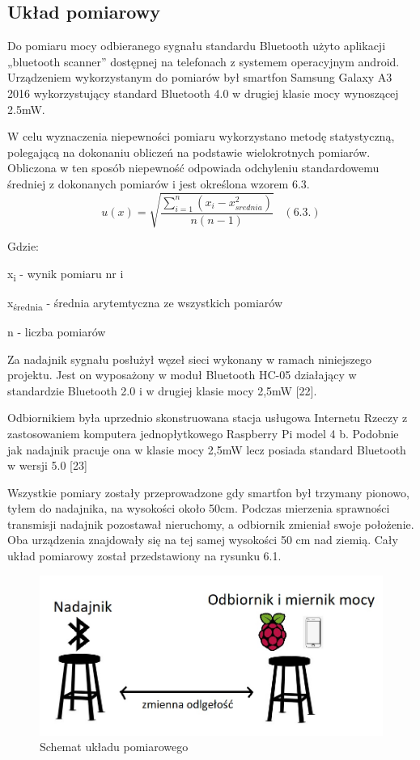 \documentclass[12pt, twoside, openany]{mwrep}
\begin{document}
\subsection{Układ pomiarowy}
Do pomiaru mocy odbieranego sygnału standardu Bluetooth użyto aplikacji „bluetooth scanner” dostępnej na telefonach z systemem operacyjnym android. Urządzeniem wykorzystanym do pomiarów był smartfon Samsung Galaxy A3 2016 wykorzystujący standard Bluetooth 4.0 w drugiej klasie mocy wynoszącej 2.5mW.
\par
W celu wyznaczenia niepewności pomiaru wykorzystano metodę statystyczną, polegającą na dokonaniu obliczeń na podstawie wielokrotnych pomiarów. Obliczona w ten sposób niepewność odpowiada odchyleniu standardowemu średniej z dokonanych pomiarów i jest określona wzorem  6.3.
\[ u(x) = \sqrt{ \frac{ \sum_{i=1}^{n} (x_i -x_{srednia}^2) } { n(n-1)  }}  \; \; \;  (6.3.)\]
\par
Gdzie: \par
 x\textsubscript{i}  - wynik pomiaru nr i 
\par
 x\textsubscript{średnia}  - średnia arytemtyczna ze wszystkich pomiarów
\par
 n - liczba pomiarów
\par

Za nadajnik sygnału posłużył węzeł sieci wykonany w ramach niniejszego projektu. Jest on wyposażony w moduł Bluetooth HC-05 działający w standardzie Bluetooth 2.0 i w drugiej klasie mocy 2,5mW [22]. \par
Odbiornikiem była uprzednio skonstruowana stacja usługowa Internetu Rzeczy z zastosowaniem komputera jednopłytkowego Raspberry Pi model 4 b. Podobnie jak nadajnik pracuje ona w klasie mocy 2,5mW lecz posiada standard Bluetooth w wersji 5.0 [23] \par
Wszystkie pomiary zostały przeprowadzone gdy smartfon był trzymany pionowo, tyłem do nadajnika, na wysokości około 50cm. Podczas mierzenia sprawności transmisji nadajnik pozostawał nieruchomy, a odbiornik zmieniał swoje położenie. Oba urządzenia znajdowały się na tej samej wysokości 50 cm nad ziemią. Cały układ pomiarowy został przedstawiony na rysunku 6.1.

\begin{figure}[H]
\centering
\includegraphics[width=\textwidth]{uklad}
\caption{Schemat układu pomiarowego}
\end{figure}
\end{document}
